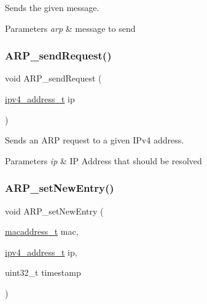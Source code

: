 Sends the given message. 


\begin{DoxyParams}{Parameters}
{\em arp} & message to send \\
\hline
\end{DoxyParams}
\mbox{\label{group__arp_ga1b3f3b5557d3cabb25df6b8f2af655bd}} 
\subsubsection{\texorpdfstring{ARP\_sendRequest()}{ARP\_sendRequest()}}
{\footnotesize\ttfamily void A\+R\+P\+\_\+send\+Request (\begin{DoxyParamCaption}\item[{\mbox{\hyperlink{group__ipv4_gad9df0882950e70d0587a4b423beb261a}{ipv4\+\_\+address\+\_\+t}}}]{ip }\end{DoxyParamCaption})}



Sends an A\+RP request to a given I\+Pv4 address. 


\begin{DoxyParams}{Parameters}
{\em ip} & IP Address that should be resolved \\
\hline
\end{DoxyParams}
\mbox{\label{group__arp_gab2b7bec25bda36bd23dc59cfe7353e66}} 
\subsubsection{\texorpdfstring{ARP\_setNewEntry()}{ARP\_setNewEntry()}}
{\footnotesize\ttfamily void A\+R\+P\+\_\+set\+New\+Entry (\begin{DoxyParamCaption}\item[{\mbox{\hyperlink{group__ethernet_gacb865bcbf50a6c8cef05581bfabff373}{macaddress\+\_\+t}}}]{mac,  }\item[{\mbox{\hyperlink{group__ipv4_gad9df0882950e70d0587a4b423beb261a}{ipv4\+\_\+address\+\_\+t}}}]{ip,  }\item[{uint32\+\_\+t}]{timestamp }\end{DoxyParamCaption})}



